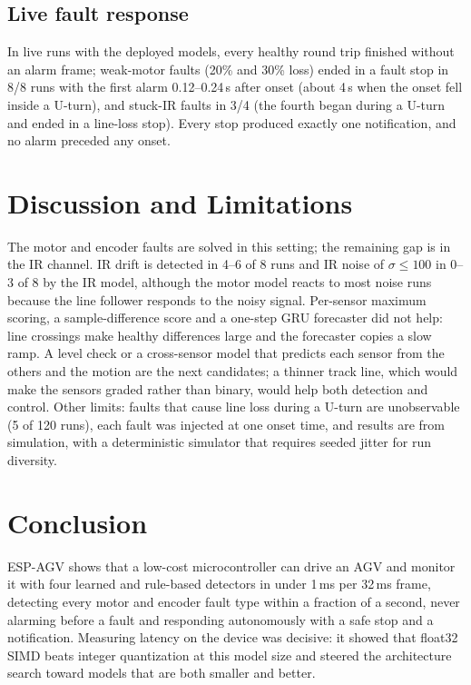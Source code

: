 \documentclass[conference]{IEEEtran}
\begin{document}
\subsection{Live fault response}
In live runs with the deployed models, every healthy round trip finished without
an alarm frame; weak-motor faults (20\% and 30\% loss) ended in a fault stop in
8/8 runs with the first alarm 0.12--0.24\,s after onset (about 4\,s when the onset
fell inside a U-turn), and stuck-IR faults in 3/4 (the fourth began during a
U-turn and ended in a line-loss stop). Every stop produced exactly one
notification, and no alarm preceded any onset.

\section{Discussion and Limitations}
The motor and encoder faults are solved in this setting; the remaining gap is
in the IR channel. IR drift is detected in 4--6 of 8 runs and IR noise of
$\sigma\le100$ in 0--3 of 8 by the IR model, although the motor model reacts to
most noise runs because the line follower responds to the noisy signal. Per-sensor
maximum scoring, a sample-difference score and a one-step GRU forecaster did not
help: line crossings make healthy differences large and the forecaster copies a
slow ramp. A level check or a cross-sensor model that predicts each sensor from
the others and the motion are the next candidates; a thinner track line, which
would make the sensors graded rather than binary, would help both detection and
control. Other limits: faults that cause line loss during a U-turn are
unobservable (5 of 120 runs), each fault was injected at one onset time, and
results are from simulation, with a deterministic simulator that requires seeded
jitter for run diversity.

\section{Conclusion}
ESP-AGV shows that a low-cost microcontroller can drive an AGV and monitor it
with four learned and rule-based detectors in under 1\,ms per 32\,ms frame,
detecting every motor and encoder fault type within a fraction of a second, never
alarming before a fault and responding autonomously with a safe stop and a
notification. Measuring latency on the device was decisive: it showed that
float32 SIMD beats integer quantization at this model size and steered the
architecture search toward models that are both smaller and better.
\end{document}
